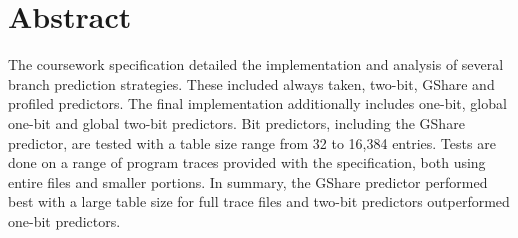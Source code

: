 \section{Abstract}
The coursework specification detailed the implementation and analysis of several branch prediction strategies. These included always taken, two-bit, GShare and profiled predictors. The final implementation additionally includes one-bit, global one-bit and global two-bit predictors. Bit predictors, including the GShare predictor, are tested with a table size range from 32 to 16,384 entries. Tests are done on a range of program traces provided with the specification, both using entire files and smaller portions. In summary, the GShare predictor performed best with a large table size for full trace files and two-bit predictors outperformed one-bit predictors.